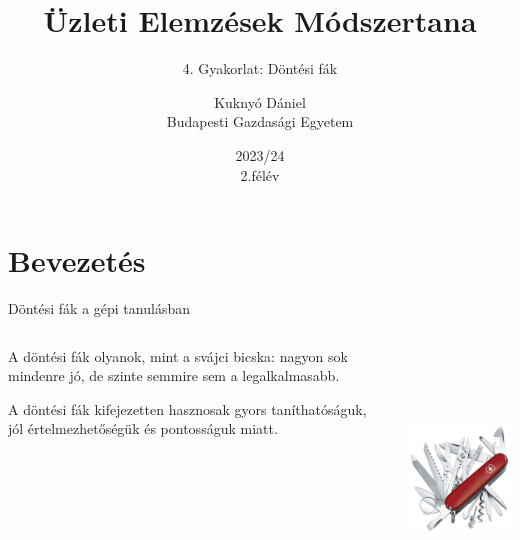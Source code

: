 \documentclass[english, aspectratio=169]{beamer}
\makeatletter
\newcommand\makebeamertitle{\frame{\maketitle}}
\let\origtableofcontents=\tableofcontents
\def\tableofcontents{\@ifnextchar[{\origtableofcontents}{\gobbletableofcontents}}
\def\gobbletableofcontents#1{\origtableofcontents}
\makeatother
\begin{document}
\section{Bevezetés}
\title[]{Üzleti Elemzések Módszertana}
\subtitle{4. Gyakorlat: Döntési fák}
\author[Kuknyó Dániel]{Kuknyó Dániel\\Budapesti Gazdasági Egyetem}
\date{2023/24\\2.félév}
\makebeamertitle

\begin{frame}
\tableofcontents{}
\end{frame}

\begin{frame}
\tableofcontents[currentsection]
\end{frame}

\begin{frame}{Döntési fák a gépi tanulásban}
\begin{columns}
\begin{column}{.5\textwidth}
A döntési fák olyanok, mint a svájci bicska: nagyon sok mindenre jó, de szinte semmire sem a legalkalmasabb.\par\medskip
A döntési fák kifejezetten hasznosak gyors taníthatóságuk, jól értelmezhetőségük és pontosságuk miatt.
\end{column}
\begin{column}{.5\textwidth}
\begin{center}
\includegraphics[width=5cm, height=7cm, keepaspectratio]{images/decision_trees_1.png}
\end{center}
\end{column}
\end{columns}
\end{frame}
\end{document}
